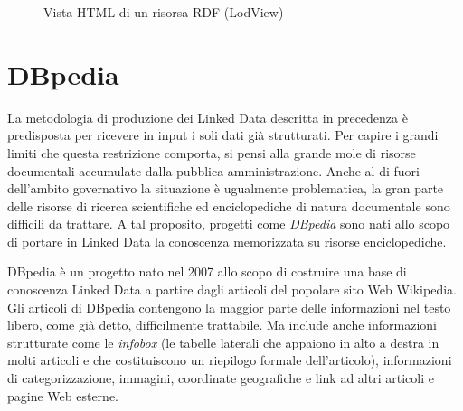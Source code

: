 \begin{figure}[htb]
	\caption{Vista HTML di un risorsa RDF (LodView)}
	\label{fig:introduction:url_risorsa_rdf}
\end{figure}


\section{DBpedia}
\label{sec:intro:dbpedia}

La metodologia di produzione dei Linked Data descritta in precedenza è predisposta per ricevere in input i soli dati già strutturati. Per capire i grandi limiti che questa restrizione comporta, si pensi alla grande mole di risorse documentali accumulate dalla pubblica amministrazione. Anche al di fuori dell'ambito governativo la situazione è ugualmente problematica, la gran parte delle risorse di ricerca scientifiche ed enciclopediche di natura documentale sono difficili da trattare. A tal proposito, progetti come \textit{DBpedia} sono nati allo scopo di portare in Linked Data la conoscenza memorizzata su risorse enciclopediche.

DBpedia è un progetto nato nel 2007 allo scopo di costruire una base di conoscenza Linked Data a partire dagli articoli del popolare sito Web Wikipedia. Gli articoli di DBpedia contengono la maggior parte delle informazioni nel testo libero, come già detto, difficilmente trattabile. Ma include anche informazioni strutturate come le \textit{infobox} (le tabelle laterali che appaiono in alto a destra in molti articoli e che costituiscono un riepilogo formale dell'articolo), informazioni di categorizzazione, immagini, coordinate geografiche e link ad altri articoli e pagine Web esterne.


